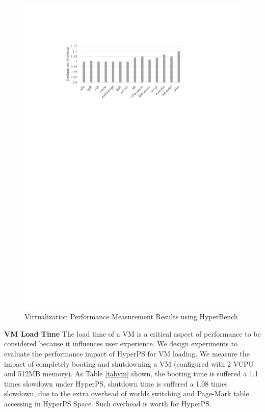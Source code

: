 \begin{figure}[htpb]
    \centering
    \includegraphics[width=0.9\linewidth]{./IMG/hyperbench.pdf}
    \caption{Virtualization Performance Measurement Results using HyperBench}
    \label{fig:hyperbench}
\end{figure}



\textbf {VM Load Time}
The load time of a VM is a critical aspect of performance to be considered because it influences user experience. We design experiments to evaluate the performance impact of HyperPS for VM loading.
 We measure the impact of completely booting and shutdowning a VM (configured with 2 VCPU and 512MB memory). As Table \ref{tabvm} shown, the booting time is suffered a 1.1 times slowdown under HyperPS, shutdown time is suffered a 1.08 times slowdown, due to the extra overhead of worlds switching and Page-Mark table accessing in HyperPS Space. Such overhead is worth for HyperPS.
